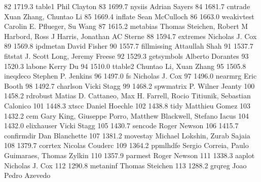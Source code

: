     82   1719.3    table1        Phil Clayton                            
    83   1699.7    nysiis        Adrian Sayers                           
    84   1681.7    cntrade       Xuan Zhang, Chuntao Li                  
    85   1669.4    inflate       Sean McCulloch                          
    86   1663.0    weakivtest    Carolin E. Pflueger, Su Wang            
    87   1615.2    metabias      Thomas Steichen, Robert M Harbord, Ross 
                                   J Harris, Jonathan AC Sterne            
    88   1594.7    extremes      Nicholas J. Cox                         
    89   1569.8    ipdmetan      David Fisher                            
    90   1557.7    fillmissing   Attaullah Shah                          
    91   1537.7    fitstat       J. Scott Long, Jeremy Freese            
    92   1529.3    getsymbols    Alberto Dorantes                        
    93   1520.3    labone        Kerry Du                                
    94   1510.0    ttable2       Chuntao Li, Xuan Zhang                  
    95   1505.8    ineqdeco      Stephen P. Jenkins                      
    96   1497.0    fs            Nicholas J. Cox                         
    97   1496.0    nearmrg       Eric Booth                              
    98   1492.7    charlson      Vicki Stagg                             
    99   1468.2    spwmatrix     P. Wilner Jeanty                        
   100   1458.2    rdrobust      Matias D. Cattaneo, Max H. Farrell,     
                                   Rocio Titiunik, Sebastian Calonico      
   101   1448.3    xtscc         Daniel Hoechle                          
   102   1438.8    tidy          Matthieu Gomez                          
   103   1432.2    cem           Gary King, Giuseppe Porro, Matthew      
                                   Blackwell, Stefano Iacus                
   104   1432.0    elixhauser    Vicki Stagg                             
   105   1430.7    sencode       Roger Newson                            
   106   1415.7    confirmdir    Dan Blanchette                          
   107   1381.2    movestay      Michael Lokshin, Zurab Sajaia           
   108   1379.7    corrtex       Nicolas Couderc                         
   109   1364.2    ppmlhdfe      Sergio Correia, Paulo Guimaraes, Thomas 
                                   Zylkin                                  
   110   1357.9    parmest       Roger Newson                            
   111   1338.3    aaplot        Nicholas J. Cox                         
   112   1290.8    metaninf      Thomas Steichen                         
   113   1288.2    grqreg        Joao Pedro Azevedo                      
